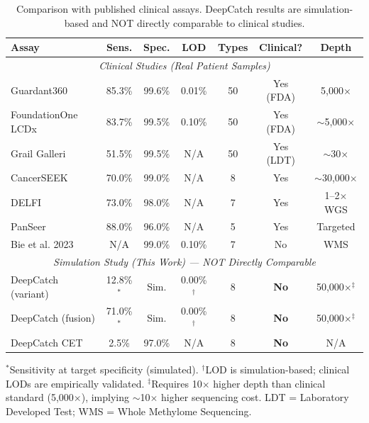 \documentclass[10pt,a4paper]{article}
\begin{document}
\begin{table}[H]
\centering
\caption{Comparison with published clinical assays. DeepCatch results are simulation-based and NOT directly comparable to clinical studies.}
\label{tab:clinical_comparison}
\begin{tabular}{l c c c c c c}
\toprule
\textbf{Assay} & \textbf{Sens.} & \textbf{Spec.} & \textbf{LOD} & \textbf{Types} & \textbf{Clinical?} & \textbf{Depth} \\
\midrule
\multicolumn{7}{c}{\textit{Clinical Studies (Real Patient Samples)}} \\
\midrule
Guardant360 & 85.3\% & 99.6\% & 0.01\% & 50 & Yes (FDA) & 5,000$\times$ \\
FoundationOne LCDx & 83.7\% & 99.5\% & 0.10\% & 50 & Yes (FDA) & $\sim$5,000$\times$ \\
Grail Galleri & 51.5\% & 99.5\% & N/A & 50 & Yes (LDT) & $\sim$30$\times$ \\
CancerSEEK & 70.0\% & 99.0\% & N/A & 8 & Yes & $\sim$30,000$\times$ \\
DELFI & 73.0\% & 98.0\% & N/A & 7 & Yes & 1--2$\times$ WGS \\
PanSeer & 88.0\% & 96.0\% & N/A & 5 & Yes & Targeted \\
Bie et al. 2023 & N/A & 99.0\% & 0.10\% & 7 & No & WMS \\
\midrule
\multicolumn{7}{c}{\textit{Simulation Study (This Work) — NOT Directly Comparable}} \\
\midrule
DeepCatch (variant) & 12.8\%$^*$ & Sim. & 0.00\%$^\dagger$ & 8 & \textbf{No} & 50,000$\times$$^\ddagger$ \\
DeepCatch (fusion) & 71.0\%$^*$ & Sim. & 0.00\%$^\dagger$ & 8 & \textbf{No} & 50,000$\times$$^\ddagger$ \\
DeepCatch CET & 2.5\% & 97.0\% & N/A & 8 & \textbf{No} & N/A \\
\bottomrule
\end{tabular}
\vspace{0.3cm}
\footnotesize{$^*$Sensitivity at target specificity (simulated). $^\dagger$LOD is simulation-based; clinical LODs are empirically validated. $^\ddagger$Requires 10$\times$ higher depth than clinical standard (5,000$\times$), implying $\sim$10$\times$ higher sequencing cost. LDT = Laboratory Developed Test; WMS = Whole Methylome Sequencing.}
\end{table}
\end{document}
